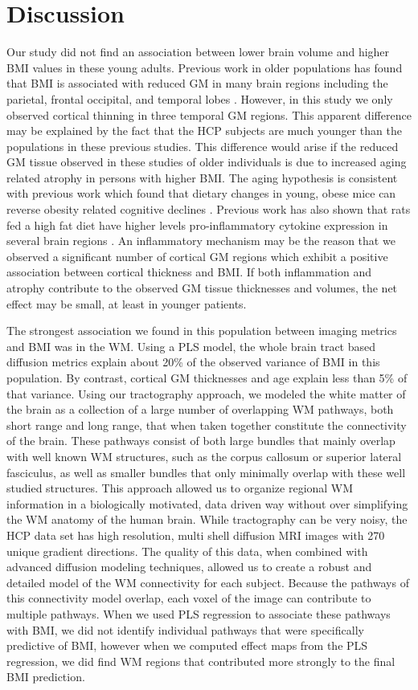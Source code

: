 \section{Discussion}

Our study did not find an association between lower brain volume and higher BMI values in these young adults. Previous work in older populations has found that BMI is associated with reduced GM in many brain regions including the parietal, frontal occipital, and temporal lobes \cite{Ho_2010, Raji_2009}. However, in this study we only observed cortical thinning in three temporal GM regions. This apparent difference may be explained by the fact that the HCP subjects are much younger than the populations in these previous studies. This difference would arise if the reduced GM tissue observed in these studies of older individuals is due to increased aging related atrophy in persons with higher BMI. The aging hypothesis is consistent with previous work which found that dietary changes in young, obese mice can reverse obesity related cognitive declines \cite{Sims_Robinson_2016}. Previous work has also shown that rats fed a high fat diet have higher levels pro-inflammatory cytokine expression in several brain regions \cite{Boitard_2014}. An inflammatory mechanism may be the reason that we observed a significant number of cortical GM regions which exhibit a positive association between cortical thickness and BMI. If both inflammation and atrophy contribute to the observed GM tissue thicknesses and volumes, the net effect may be small, at least in younger patients.

The strongest association we found in this population between imaging metrics and BMI was in the WM. Using a PLS model, the whole brain tract based diffusion metrics explain about 20\% of the observed variance of BMI in this population. By contrast, cortical GM thicknesses and age explain less than 5\% of that variance. Using our tractography approach, we modeled the white matter of the brain as a collection of a large number of overlapping WM pathways, both short range and long range, that when taken together constitute the connectivity of the brain. These pathways consist of both large bundles that mainly overlap with well known WM structures, such as the corpus callosum or superior lateral fasciculus, as well as smaller bundles that only minimally overlap with these well studied structures. This approach allowed us to organize regional WM information in a biologically motivated, data driven way without over simplifying the WM anatomy of the human brain. While tractography can be very noisy, the HCP data set has high resolution, multi shell diffusion MRI images with 270 unique gradient directions. The quality of this data, when combined with advanced diffusion modeling techniques, allowed us to create a robust and detailed model of the WM connectivity for each subject. Because the pathways of this connectivity model overlap, each voxel of the image can contribute to multiple pathways. When we used PLS regression to associate these pathways with BMI, we did not identify individual pathways that were specifically predictive of BMI, however when we computed effect maps from the PLS regression, we did find WM regions that contributed more strongly to the final BMI prediction.   


